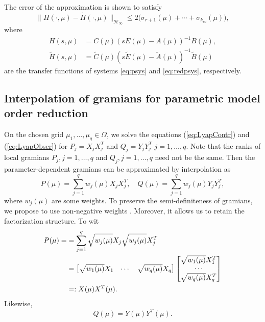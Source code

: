 The error of the approximation is shown to satisfy 
\begin{equation*}%
\|H(\cdot,\mu)-\tilde{H}(\cdot,\mu)\|_{\mathcal{H}_\infty} \leq 2\bigl(\sigma_{r+1}(\mu) + \cdots + \sigma_{k_{co}}(\mu)\bigr),
\end{equation*}
where 
\begin{align*}
H(s,\mu)& =C(\mu)(sE(\mu)-A(\mu))^{-1}B(\mu), \\
\tilde{H}(s,\mu)&=\tilde{C}(\mu)(s\tilde{E}(\mu)-\tilde{A}(\mu))^{-1}\tilde{B}(\mu)
\end{align*}
are the transfer functions of systems \eqref{eq:psys} and \eqref{eq:redpsys}, respectively. 
\subsection{Interpolation of gramians for parametric model order reduction}
On the chosen grid $\mu_1,\ldots,\mu_q \in \Omega$, we solve the equations (\ref{eq:LyapContr}) and (\ref{eq:LyapObser}) 
for $P_j=X_j^{}X_j^T$ %
and $Q_j=Y_j^{}Y_j^T$
$j=1,\ldots,q$. Note that the ranks of local gramians $P_j, j=1,\ldots,q$ and $Q_j, j=1,\ldots,q$ need not be the same. Then the parameter-dependent gramians can be approximated by interpolation as
\begin{equation*}
P(\mu) = \sum\limits_{j=1}^qw_j(\mu)X_j^{}X_j^T,\quad Q(\mu) = \sum\limits_{j=1}^qw_j(\mu)Y_j^{}Y_j^T,
\end{equation*}
where $w_j(\mu)$ are some weights. To preserve the semi-definiteness of gramians, we propose to use non-negative weights \cite{Alla03}. Moreover, it allows us to retain the factorization structure. To wit
\begin{align}\label{S3GramparaLR}
P(\mu) = 
&= \sum\limits_{j=1}^q\sqrt{w_j(\mu)}X_{j}\sqrt{w_j(\mu)}X^{T}_{j}\\ \notag
&=\begin{bmatrix}
\sqrt{w_1(\mu)}X_{1}&\cdots & \sqrt{w_q(\mu)}X_{q}
\end{bmatrix}
\begin{bmatrix}
\sqrt{w_1(\mu)}X^{T}_{1}\\ \cdots \\ \sqrt{w_q(\mu)}X^{T}_{q}
\end{bmatrix}\\ \notag
&=: X(\mu)X^T(\mu).
\end{align}
Likewise, 
\begin{equation}
	Q(\mu) = Y(\mu)Y^T(\mu).
\end{equation}


